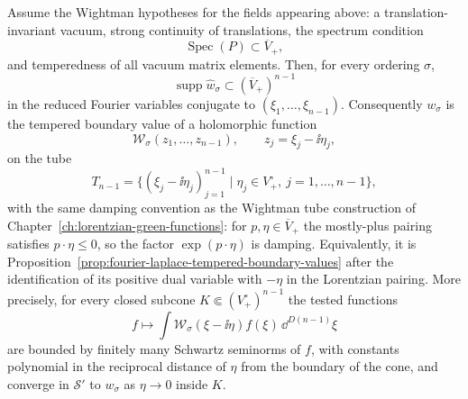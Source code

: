 \begin{theorem}
\label{thm:primitive-wightman-tube-domain}
Assume the Wightman hypotheses for the fields appearing above: a
translation-invariant vacuum, strong continuity of translations, the spectrum
condition
\[
  \operatorname{Spec}(P)\subset \overline V_+,
\]
and temperedness of all vacuum matrix elements.  Then, for every ordering
\(\sigma\),
\begin{equation}
  \operatorname{supp}\widehat w_\sigma
  \subset
  (\overline V_+)^{n-1}
  \label{eq:ordered-wightman-spectral-support}
\end{equation}
in the reduced Fourier variables conjugate to
\((\xi_1,\ldots,\xi_{n-1})\).  Consequently \(w_\sigma\) is the tempered
boundary value of a holomorphic function
\[
  \mathcal W_\sigma(z_1,\ldots,z_{n-1}),
  \qquad
  z_j=\xi_j-\ii\eta_j ,
\]
on the tube
\begin{equation}
  T_{n-1}
  =
  \{(\xi_j-\ii\eta_j)_{j=1}^{n-1}\mid
    \eta_j\in V_+^\circ,\ j=1,\ldots,n-1\},
  \label{eq:primitive-forward-tube}
\end{equation}
with the same damping convention as the Wightman tube construction of
Chapter~\ref{ch:lorentzian-green-functions}: for \(p,\eta\in\overline V_+\)
the mostly-plus pairing satisfies \(p\cdot\eta\le0\), so the factor
\(\exp(p\cdot\eta)\) is damping.  Equivalently, it is
Proposition~\ref{prop:fourier-laplace-tempered-boundary-values} after the
identification of its positive dual variable with \(-\eta\) in the
Lorentzian pairing.  More precisely, for every closed subcone
\(K\Subset(V_+^\circ)^{n-1}\) the tested functions
\[
  f\longmapsto
  \int \mathcal W_\sigma(\xi-\ii\eta)f(\xi)\,\dd^{D(n-1)}\xi
\]
are bounded by finitely many Schwartz seminorms of \(f\), with constants
polynomial in the reciprocal distance of \(\eta\) from the boundary of the
cone, and converge in \(\mathcal S'\) to \(w_\sigma\) as
\(\eta\to0\) inside \(K\).
\end{theorem}

